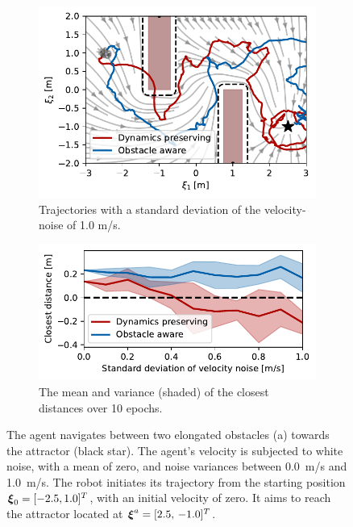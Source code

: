 \begin{figure}
    \centering
    \begin{subfigure}{\columnwidth}
      \centerline{\includegraphics[width=\textwidth]{figures/trajectory_velocity_noise}}
      \caption{Trajectories with a standard deviation of the velocity-noise of 1.0 m/s.}
      \label{fig:trajectory_velocity_noise}
    \end{subfigure}
    \begin{subfigure}{\columnwidth}
    \includegraphics[width=\textwidth]{figures/comparison_velocity_noise}
      \caption{The mean and variance (shaded) of the closest distances over 10 epochs.}
      \label{fig:comparison_velocity_noise}
    \end{subfigure}
	\caption{The agent navigates between two elongated obstacles (a) towards the attractor (black star). The agent's velocity is subjected to white noise, with a mean of zero, and noise variances between \qty{0.0}{m/s} and \qty{1.0}{m/s}. The robot initiates its trajectory from the starting position $\boldsymbol{\xi}_0 = [-2.5, 1.0]^T$, with an initial velocity of zero. It aims to reach the attractor located at $\boldsymbol{\xi}^a = [2.5, \, -1.0]^T$.}
\label{fig:velocity_noise}
\end{figure}

